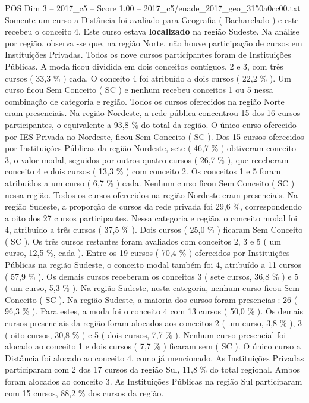 \begin{textsample}{POS Dim 3 – 2017\_c5 – Score 1.00 – 2017\_c5/enade\_2017\_geo\_3150a0cc00.txt}
Somente um curso a Distância foi avaliado para Geografia ( Bacharelado ) e este recebeu o conceito 4.
Este curso estava \textbf{localizado} na região Sudeste.
Na análise por região, observa -se que, na região Norte, não houve participação de cursos em Instituições Privadas.
Todos os nove cursos participantes foram de Instituições Públicas.
A moda ficou dividida em dois conceitos contíguos, 2 e 3, com três cursos ( 33,3 \% ) cada.
O conceito 4 foi atribuído a dois cursos ( 22,2 \% ).
Um curso ficou Sem Conceito ( SC ) e nenhum recebeu conceitos 1 ou 5 nessa combinação de categoria e região.
Todos os cursos oferecidos na região Norte eram presenciais.
Na região Nordeste, a rede pública concentrou 15 dos 16 cursos participantes, o equivalente a 93,8 \% do total da região.
O único curso oferecido por IES Privada no Nordeste, ficou Sem Conceito ( SC ).
Dos 15 cursos oferecidos por Instituições Públicas da região Nordeste, sete ( 46,7 \% ) obtiveram conceito 3, o valor modal, seguidos por outros quatro cursos ( 26,7 \% ), que receberam conceito 4 e dois cursos ( 13,3 \% ) com conceito 2.
Os conceitos 1 e 5 foram atribuídos a um curso ( 6,7 \% ) cada.
Nenhum curso ficou Sem Conceito ( SC ) nessa região.
Todos os cursos oferecidos na região Nordeste eram presenciais.
Na região Sudeste, a proporção de cursos da rede privada foi 29,6 \%, correspondendo a oito dos 27 cursos participantes.
Nessa categoria e região, o conceito modal foi 4, atribuído a três cursos ( 37,5 \% ).
Dois cursos ( 25,0 \% ) ficaram Sem Conceito ( SC ).
Os três cursos restantes foram avaliados com conceitos 2, 3 e 5 ( um curso, 12,5 \%, cada ).
Entre os 19 cursos ( 70,4 \% ) oferecidos por Instituições Públicas na região Sudeste, o conceito modal também foi 4, atribuído a 11 cursos ( 57,9 \% ).
Os demais cursos receberam os conceitos 3 ( sete cursos, 36,8 \% ) e 5 ( um curso, 5,3 \% ).
Na região Sudeste, nesta categoria, nenhum curso ficou Sem Conceito ( SC ).
Na região Sudeste, a maioria dos cursos foram presencias : 26 ( 96,3 \% ).
Para estes, a moda foi o conceito 4 com 13 cursos ( 50,0 \% ).
Os demais cursos presenciais da região foram alocados aos conceitos 2 ( um curso, 3,8 \% ), 3 ( oito cursos, 30,8 \% ) e 5 ( dois cursos, 7,7 \% ).
Nenhum curso presencial foi alocado ao conceito 1 e dois cursos ( 7,7 \% ) ficaram sem ( SC ).
O único curso a Distância foi alocado ao conceito 4, como já mencionado.
As Instituições Privadas participaram com 2 dos 17 cursos da região Sul, 11,8 \% do total regional.
Ambos foram alocados ao conceito 3.
As Instituições Públicas na região Sul participaram com 15 cursos, 88,2 \% dos cursos da região.

\end{textsample}
